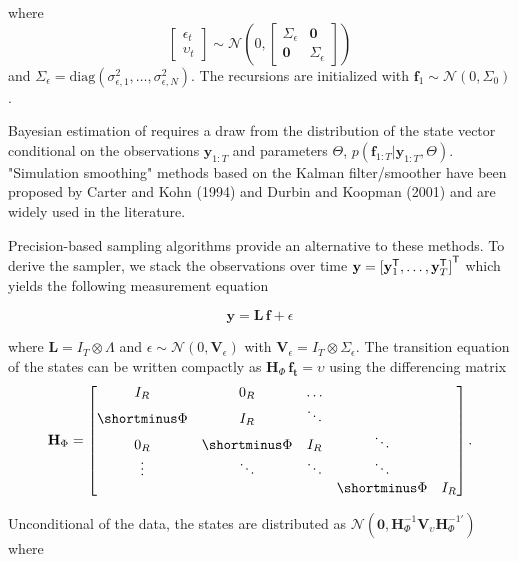 \documentclass[notitlepage,a4paper,12pt]{article}
\newcommand{\transpose}[1]{{#1}^{\sf{T}}}
\begin{document}
where 
$$
\begin{bmatrix}
    \epsilon_t \\
    \upsilon_t
\end{bmatrix}
\sim \mathcal{N}(0,
\begin{bmatrix}
\Sigma_{\epsilon} & \mathbf{0} \\
\mathbf{0} & \Sigma_{\epsilon}
\end{bmatrix}
)
$$
and $\Sigma_{\epsilon} = \text{diag}(\sigma^2_{\epsilon, 1}, \dots, \sigma^2_{\epsilon, N})$. The recursions are initialized with $\mathbf{f}_1 \sim \mathcal{N}(0, \Sigma_0)$.

Bayesian estimation of  requires a draw from the distribution of the state vector conditional on the observations $\mathbf{y}_{1:T}$ and parameters $\Theta$, $p(\mathbf{f}_{1:T}|\mathbf{y}_{1:T}, \Theta)$. "Simulation smoothing" methods based on the Kalman filter/smoother have been proposed by Carter and Kohn (1994) and Durbin and Koopman (2001) and are widely used in the literature.

Precision-based sampling algorithms \citep{chanjeliazkov_2009} provide an alternative to these methods. To derive the sampler, we stack the observations over time $\mathbf{y} = \transpose{[\transpose{\mathbf{y}}_1, \dots, \transpose{\mathbf{y}}_T]}$ which yields the following measurement equation

\begin{equation}
\mathbf{y} = \mathbf{L} \, \mathbf{f} + \epsilon
\end{equation} 

where $ \mathbf{L} = I_T \otimes \Lambda$ and $\epsilon \sim \mathcal{N}(0, \mathbf{V}_{\epsilon})$ with $\mathbf{V}_{\epsilon} = I_T \otimes \Sigma_{\epsilon}$. The transition equation of the states can be written compactly as $\mathbf{H}_{\Phi} \, \mathbf{f_t} = \upsilon$ using the differencing matrix 
$$
\mathbf{H}_{\Phi}
=
\begin{bmatrix}
    I_R & 0_R & \dots \\
    \shortminus\Phi & I_R & \ddots \\
    0_R & \shortminus\Phi & I_R & \ddots \\
    \vdots & \ddots & \ddots & \ddots \\
    & & & \shortminus\Phi & I_R
\end{bmatrix}.
$$

Unconditional of the data, the states are distributed as $\mathcal{N}(\mathbf{0},\mathbf{H}^{-1}_{\Phi} \mathbf{V}_{\upsilon} \mathbf{H}^{-1'}_{\Phi})$ where 
\end{document}
